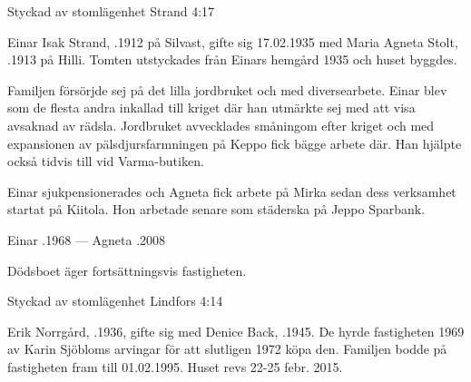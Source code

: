 Styckad av stomlägenhet Strand 4:17


%
Einar Isak Strand, .1912 på Silvast, gifte sig 17.02.1935 med Maria Agneta Stolt, .1913 på Hilli. Tomten utstyckades från Einars hemgård 1935 och huset byggdes.

Familjen försörjde sej på det lilla jordbruket och med diversearbete. Einar blev som de flesta andra inkallad till kriget där han utmärkte sej med att visa avsaknad av rädsla. Jordbruket avvecklades småningom efter kriget och med expansionen av pälsdjursfarmningen på Keppo fick bägge arbete där. Han hjälpte också tidvis till vid Varma-butiken.

Einar sjukpensionerades och Agneta fick arbete på Mirka sedan dess verksamhet startat på Kiitola. Hon arbetade senare som städerska på Jeppo Sparbank.
\begin{jhchildren}
  \item {}
  \item {}
  \item {}
  \item {}
\end{jhchildren}

Einar .1968  ---  Agneta .2008

Dödsboet äger fortsättningsvis fastigheten.



%

Styckad av stomlägenhet Lindfors 4:14


%
Erik Norrgård, .1936, gifte sig med Denice Back, .1945. De hyrde fastigheten 1969 av Karin Sjöbloms arvingar för att slutligen 1972 köpa den. Familjen bodde på fastigheten fram till 01.02.1995. Huset revs 22-25 febr. 2015.

